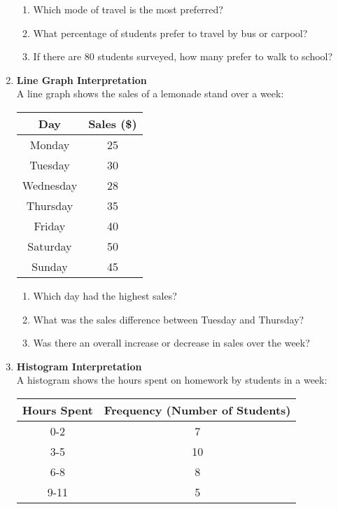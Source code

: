 \begin{enumerate}[label=\color{blue}\arabic*.]
    \begin{enumerate}[label=(\alph*)]
        \item Which mode of travel is the most preferred?
        \item What percentage of students prefer to travel by bus or carpool?
        \item If there are 80 students surveyed, how many prefer to walk to school?
    \end{enumerate}

    \item \textbf{Line Graph Interpretation} \\
    A line graph shows the sales of a lemonade stand over a week:

    \begin{center}
    \begin{tabular}{|c|c|}
        \hline
        \textbf{Day} & \textbf{Sales (\$)} \\
        \hline
        Monday & 25 \\
        Tuesday & 30 \\
        Wednesday & 28 \\
        Thursday & 35 \\
        Friday & 40 \\
        Saturday & 50 \\
        Sunday & 45 \\
        \hline
    \end{tabular}
    \end{center}

    \begin{enumerate}[label=(\alph*)]
        \item Which day had the highest sales?
        \item What was the sales difference between Tuesday and Thursday?
        \item Was there an overall increase or decrease in sales over the week?
    \end{enumerate}
    
    \item \textbf{Histogram Interpretation} \\
    A histogram shows the hours spent on homework by students in a week:

    \begin{center}
    \begin{tabular}{|c|c|}
        \hline
        \textbf{Hours Spent} & \textbf{Frequency (Number of Students)} \\
        \hline
        0-2 & 7 \\
        3-5 & 10 \\
        6-8 & 8 \\
        9-11 & 5 \\
        \hline
    \end{tabular}
    \end{center}


\end{enumerate}
